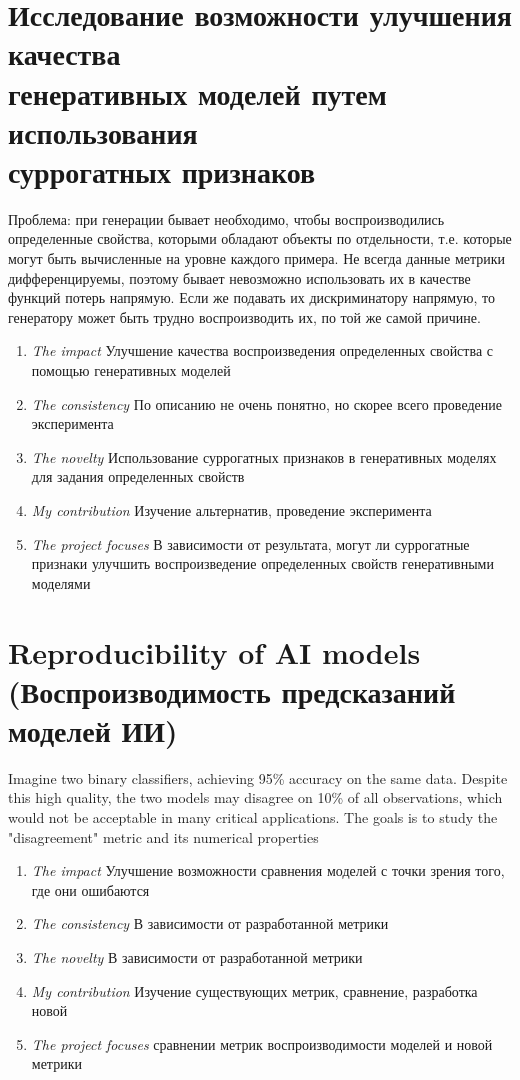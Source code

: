 \documentclass[12pt]{article}
\begin{document}
\section{Исследование возможности улучшения качества \\генеративных моделей путем использования\\суррогатных признаков}
Проблема: при генерации бывает необходимо, чтобы воспроизводились определенные свойства, которыми обладают объекты по отдельности, т.е. которые могут быть вычисленные на уровне каждого примера. Не всегда данные метрики дифференцируемы, поэтому бывает невозможно использовать их в качестве функций потерь напрямую. Если же подавать их дискриминатору напрямую, то генератору может быть трудно воспроизводить их, по той же самой причине. 
\begin{enumerate}
\item \emph{The impact} Улучшение качества воспроизведения определенных свойства с помощью генеративных моделей
\item \emph{The consistency} По описанию не очень понятно, но скорее всего проведение эксперимента
\item \emph{The novelty} Использование суррогатных признаков в генеративных моделях для задания определенных свойств
\item \emph{My contribution} Изучение альтернатив, проведение эксперимента
\item \emph{The project focuses} В зависимости от результата, могут ли суррогатные признаки улучшить воспроизведение определенных свойств генеративными моделями
\end{enumerate}

\section{Reproducibility of AI models  (Воспроизводимость предсказаний моделей ИИ)}
Imagine two binary classifiers, achieving 95\% accuracy on the same data. Despite this high quality, the two models may disagree on 10\% of all observations, which would not be acceptable in many critical applications. The goals is to study the "disagreement" metric and its numerical properties
\begin{enumerate}
\item \emph{The impact} Улучшение возможности сравнения моделей с точки зрения того, где они ошибаются
\item \emph{The consistency} В зависимости от разработанной метрики
\item \emph{The novelty} В зависимости от разработанной метрики
\item \emph{My contribution} Изучение существующих метрик, сравнение, разработка новой
\item \emph{The project focuses} сравнении метрик воспроизводимости моделей и новой метрики
\end{enumerate}
\end{document}
